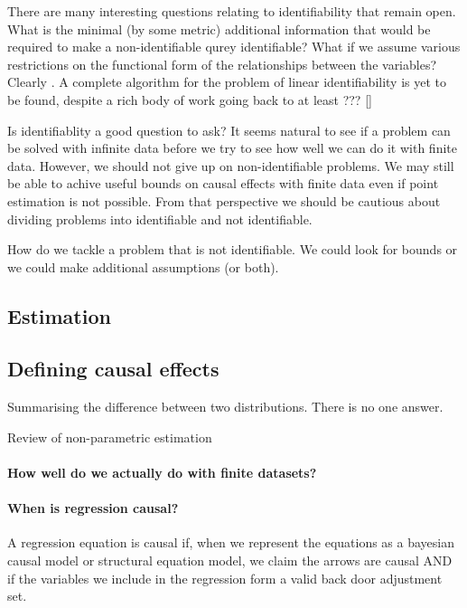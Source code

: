 \documentclass[11pt,a4paper,oneside]{book}
\begin{document}

There are many interesting questions relating to identifiability that remain open. What is the minimal (by some metric) additional information that would be required to make a non-identifiable qurey identifiable? What if we assume various restrictions on the functional form of the relationships between the variables? Clearly  . A complete algorithm for the problem of linear identifiability is yet to be found, despite a rich body of work going back to at least ??? \ref{}

Is identifiablity a good question to ask? It seems natural to see if a problem can be solved with infinite data before we try to see how well we can do it with finite data. However, we should not give up on non-identifiable problems. We may still be able to achive useful bounds on causal effects with finite data even if point estimation is not possible. From that perspective we should be cautious about dividing problems into identifiable and not identifiable. 

How do we tackle a problem that is not identifiable. We could look for bounds or we could make additional assumptions (or both). 

\subsection*{Estimation}
\subsection*{Defining causal effects} Summarising the difference between two distributions. There is no one answer. \cite{Janzing2013}

\cite{Imbens2004} Review of non-parametric estimation
\cite{causal estimation is covariate shift}
\paragraph*{How well do we actually do with finite datasets?}

\paragraph*{When is regression causal?}
A regression equation is causal if, when we represent the equations as a bayesian causal model or structural equation model, we claim the arrows are causal AND if the variables we include in the regression form a valid back door adjustment set. 
\end{document}
